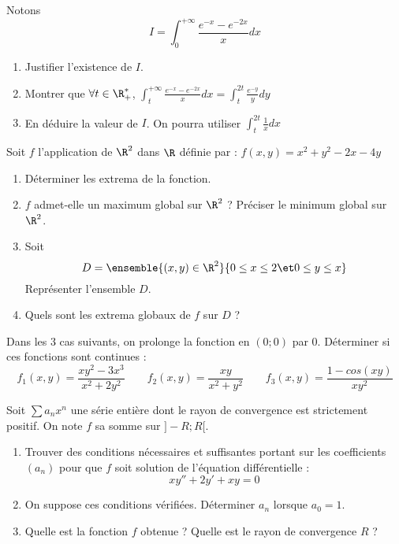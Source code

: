 \documentclass[french,11pt,twoside]{VcCours}
\begin{document}
\begin{Exercice}
  Notons
  \[I=\int_0^{+\infty}\frac{e^{-x}-e^{-2x}}{x}dx\]
  \begin{enumerate}
    \item Justifier l'existence de $I$.
    \item Montrer que $\forall t\in\R_+^*$, $\int_t^{+\infty}\frac{e^{-x}-e^{-2x}}{x}dx
    =\int_{t}^{2t}\frac{e^{-y}}{y}dy$
    \item En déduire la valeur de $I$. On pourra utiliser $\int_{t}^{2t}\frac{1}{x}dx$
\end{enumerate}
\end{Exercice}


\begin{Exercice}
  Soit $f$ l'application de $\R^2$ dans $\R$ définie par :
  $f(x,y) = x^2 + y^2-2x-4y$
  \begin{enumerate}
    \item Déterminer les extrema de la fonction.
    \item $f$ admet-elle un maximum global sur $\R^2$ ? Préciser le minimum global sur $\R^2$.
    \item Soit \[D = \ensemble{(x,y)\in\R^2}{0 \leq x \leq 2\et0 \leq y \leq x}\]
    Représenter l'ensemble $D$.
    \item Quels sont les extrema globaux de $f$ sur $D$ ?
\end{enumerate}
\end{Exercice}


\begin{Exercice}
  Dans les $3$ cas suivants, on prolonge la fonction en $(0;0)$ par $0$. Déterminer si ces fonctions sont continues :
  \[f_1(x,y)=\frac{xy^2-3x^3}{x^2+2y^2}\qquad f_2(x,y)=\frac{xy}{x^2+y^2}
  \qquad f_3(x,y)=\frac{1-cos(xy)}{xy^2}\]
\end{Exercice}


\begin{Exercice}
  Soit $\sum a_nx^n$ une série entière dont le rayon de convergence est strictement positif. 
  On note $f$ sa somme sur $]-R;R[$.
    \begin{enumerate}
      \item Trouver des conditions nécessaires et suffisantes portant sur les coefficients $(a_n)$ pour que $f$ soit solution de
    l'équation différentielle :
    \[xy'' + 2y' + xy = 0\]
    \item On suppose ces conditions vérifiées. Déterminer $a_n$ lorsque $a_0 = 1$.
    \item Quelle est la fonction $f$ obtenue ? Quelle est le rayon de convergence $R$ ?
  \end{enumerate}
\end{Exercice}
\end{document}
